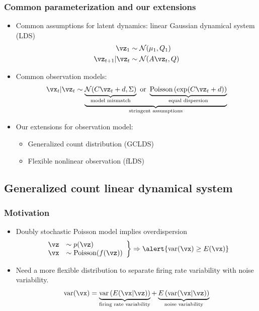 \documentclass[16pt,presentation]{beamer}
\begin{document}
\begin{frame}
\frametitle{Common parameterization and our extensions}
\begin{itemize}
\item Common assumptions for latent dynamics: linear Gaussian dynamical system (LDS)
 \[\begin{split}
 \vz_{1} &\sim \N(\mu_1, Q_1)\\
 \vz_{t+1} | \vz_{t} &\sim \N(A \vz_{t}, Q)
  \end{split}\]
\item Common observation models:
 \[\vx_t | \vz_t \sim \underbrace{\underbrace{\N(C \vz_t + d, \Sigma)}_{\text{model mismatch}}
 \text{ or }
 \underbrace{\text{Poisson}\left(\exp(C \vz_t + d)\right)}_{\text{equal dispersion}}}_\text{stringent assumptions}\]
\item Our extensions for observation model:
\begin{itemize}
\item Generalized count distribution (GCLDS) \parencite{Gao2015}
\item Flexible nonlinear observation (fLDS) \parencite{gao2016linear}
\end{itemize}
\end{itemize}
\end{frame}


\subsection[]{Generalized count linear dynamical system}
\begin{frame}
\frametitle{Motivation}
\begin{itemize}
\item Doubly stochastic Poisson model implies \alert{overdispersion}
\[\left. \begin{array}{ll} \vz &\sim p(\vz) \\ \vx &\sim \text{Poisson}(f(\vz)) \end{array} \right\} \Rightarrow \alert{\text{var}(\vx) \geq E(\vx)}\]
\item Need a more flexible distribution to separate \alert{firing rate variability} with \alert{noise variability}.
\[\text{var}(\vx) = \underbrace{\text{var}\left(E(\vx | \vz)\right)}_\text{firing rate variability} + \underbrace{E\left(\text{var}(\vx | \vz)\right)}_\text{noise variability}\]
\end{itemize}
\end{frame}
\end{document}
